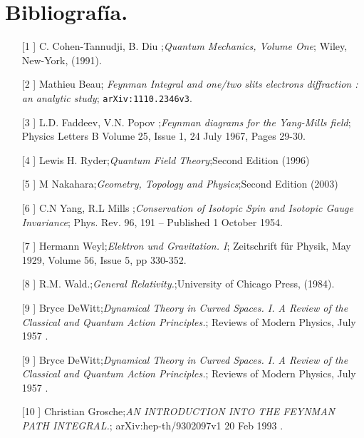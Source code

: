 \chapter{Bibliografía.}
\begin{itemize}
\item[[1]] C. Cohen-Tannudji, B. Diu ;\textit{Quantum Mechanics, Volume One}; Wiley, New-York, (1991).
\item[[2]] Mathieu Beau; \textit{Feynman Integral and one/two slits electrons diffraction : an analytic study}; \texttt{arXiv:1110.2346v3}.
\item[[3]]  L.D. Faddeev,  V.N. Popov ;\textit{Feynman diagrams for the Yang-Mills field}; Physics Letters B Volume 25, Issue 1, 24 July 1967, Pages 29-30.
\item[[4]] Lewis H. Ryder;\textit{Quantum Field Theory};Second Edition (1996) 
\item[[5]] M Nakahara;\textit{Geometry, Topology and Physics};Second Edition (2003) 
\item[[6]]  C.N Yang,  R.L Mills ;\textit{Conservation of Isotopic Spin and Isotopic Gauge Invariance}; Phys. Rev. 96, 191 – Published 1 October 1954.
\item[[7]]  Hermann Weyl;\textit{Elektron und Gravitation. I}; Zeitschrift für Physik, May 1929, Volume 56, Issue 5, pp 330-352.
\item[[8]] R.M. Wald.;\textit{General Relativity.};University of Chicago Press, (1984). 
\item[[9]]  Bryce DeWitt;\textit{Dynamical Theory in Curved Spaces. I. A Review of the Classical and Quantum Action Principles.}; Reviews of Modern Physics, July 1957 .
\item[[9]]  Bryce DeWitt;\textit{Dynamical Theory in Curved Spaces. I. A Review of the Classical and Quantum Action Principles.}; Reviews of Modern Physics, July 1957 .
\item[[10]]  Christian Grosche;\textit{AN INTRODUCTION INTO
THE FEYNMAN PATH INTEGRAL.}; arXiv:hep-th/9302097v1 20 Feb 1993 .
\end{itemize}
